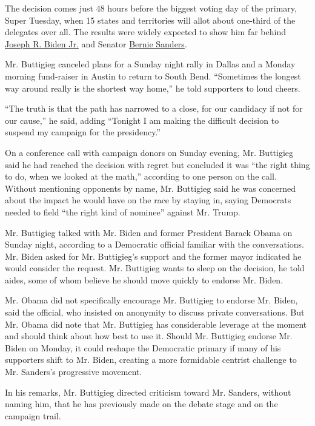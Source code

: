 The decision comes just 48 hours before the biggest voting day of the
primary, Super Tuesday, when 15 states and territories will allot about
one-third of the delegates over all. The results were widely expected to
show him far behind
\href{https://www.nytimes3xbfgragh.onion/interactive/2020/us/elections/joe-biden.html}{Joseph
R. Biden Jr.} and Senator
\href{https://www.nytimes3xbfgragh.onion/interactive/2020/us/elections/bernie-sanders.html}{Bernie
Sanders}.

Mr. Buttigieg canceled plans for a Sunday night rally in Dallas and a
Monday morning fund-raiser in Austin to return to South Bend.
``Sometimes the longest way around really is the shortest way home,'' he
told supporters to loud cheers.

``The truth is that the path has narrowed to a close, for our candidacy
if not for our cause,'' he said, adding ``Tonight I am making the
difficult decision to suspend my campaign for the presidency.''

On a conference call with campaign donors on Sunday evening, Mr.
Buttigieg said he had reached the decision with regret but concluded it
was ``the right thing to do, when we looked at the math,'' according to
one person on the call. Without mentioning opponents by name, Mr.
Buttigieg said he was concerned about the impact he would have on the
race by staying in, saying Democrats needed to field ``the right kind of
nominee'' against Mr. Trump.

Mr. Buttigieg talked with Mr. Biden and former President Barack Obama on
Sunday night, according to a Democratic official familiar with the
conversations. Mr. Biden asked for Mr. Buttigieg's support and the
former mayor indicated he would consider the request. Mr. Buttigieg
wants to sleep on the decision, he told aides, some of whom believe he
should move quickly to endorse Mr. Biden.

Mr. Obama did not specifically encourage Mr. Buttigieg to endorse Mr.
Biden, said the official, who insisted on anonymity to discuss private
conversations. But Mr. Obama did note that Mr. Buttigieg has
considerable leverage at the moment and should think about how best to
use it. Should Mr. Buttigieg endorse Mr. Biden on Monday, it could
reshape the Democratic primary if many of his supporters shift to Mr.
Biden, creating a more formidable centrist challenge to Mr. Sanders's
progressive movement.

In his remarks, Mr. Buttigieg directed criticism toward Mr. Sanders,
without naming him, that he has previously made on the debate stage and
on the campaign trail.

